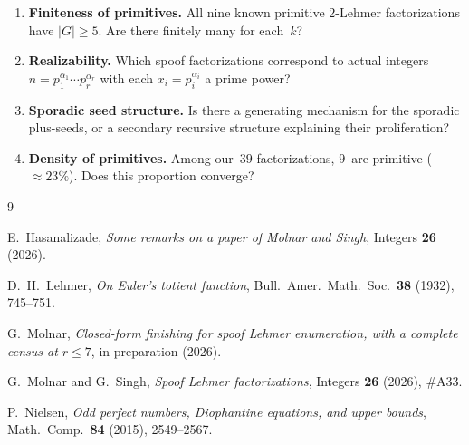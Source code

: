 \documentclass[11pt]{article}
\theoremstyle{definition}
\theoremstyle{remark}
\begin{document}
\begin{enumerate}[label=\arabic*.]
  \item \textbf{Finiteness of primitives.}  All nine known primitive
    $2$-Lehmer factorizations have $|G| \ge 5$.  Are there finitely many
    for each~$k$?

  \item \textbf{Realizability.}  Which spoof factorizations correspond
    to actual integers $n = p_1^{\alpha_1} \cdots p_r^{\alpha_r}$ with
    each $x_i = p_i^{\alpha_i}$ a prime power?

  \item \textbf{Sporadic seed structure.}  Is there a generating mechanism
    for the sporadic plus-seeds, or a secondary recursive structure
    explaining their proliferation?

  \item \textbf{Density of primitives.}  Among our~$39$ factorizations,
    $9$~are primitive (${\approx}23\%$).  Does this proportion converge?
\end{enumerate}


\begin{thebibliography}{9}

E.~Hasanalizade, \emph{Some remarks on a paper of Molnar and Singh},
Integers \textbf{26} (2026).

D.~H.~Lehmer, \emph{On Euler's totient function}, Bull.\ Amer.\ Math.\
Soc.\ \textbf{38} (1932), 745--751.

G.~Molnar, \emph{Closed-form finishing for spoof Lehmer enumeration,
with a complete census at $r \le 7$}, in preparation (2026).

G.~Molnar and G.~Singh, \emph{Spoof Lehmer factorizations}, Integers
\textbf{26} (2026), \#A33.

P.~Nielsen, \emph{Odd perfect numbers, Diophantine equations, and upper
bounds}, Math.\ Comp.\ \textbf{84} (2015), 2549--2567.

\end{thebibliography}
\end{document}
